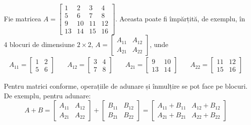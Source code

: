 \documentclass{exam}
\begin{document}
Fie matricea $A = \begin{bmatrix} 1 & 2 & 3 & 4 \\ 5 & 6 & 7 & 8 \\ 9 & 10 & 11 & 12 \\ 13 & 14 & 15 & 16\end{bmatrix}$.
Aceasta poate fi împărțită, de exemplu, în 4 blocuri de dimensiune $2 \times 2$,
$A = \begin{bmatrix} A_{11} & A_{12} \\ A_{21} & A_{22} \end{bmatrix}$, unde
\begin{equation*}
	\begin{split}
		A_{11} = \begin{bmatrix} 1 & 2 \\ 5 & 6 \end{bmatrix}
	\end{split}
	\quad
	\begin{split}
		A_{12} = \begin{bmatrix} 3 & 4 \\ 7 & 8 \end{bmatrix}
	\end{split}
	\quad
	\begin{split}
		A_{21} = \begin{bmatrix} 9 & 10 \\ 13 & 14 \end{bmatrix}
	\end{split}
	\quad
	\begin{split}
		A_{22}  = \begin{bmatrix} 11 & 12 \\ 15 & 16 \end{bmatrix}
	\end{split}
\end{equation*}

Pentru matrici conforme, operațiile de adunare și înmulțire se pot face pe
blocuri. De exemplu, pentru adunare:
\begin{equation*}
	A + B = \begin{bmatrix} A_{11} & A_{12} \\ A_{21} & A_{22} \end{bmatrix} + \begin{bmatrix} B_{11} & B_{12} \\ B_{21} & B_{22} \end{bmatrix} = \begin{bmatrix} A_{11} + B_{11} & A_{12} + B_{12} \\ A_{21} + B_{21} & A_{22} + B_{22} \end{bmatrix}
\end{equation*}
\end{document}
